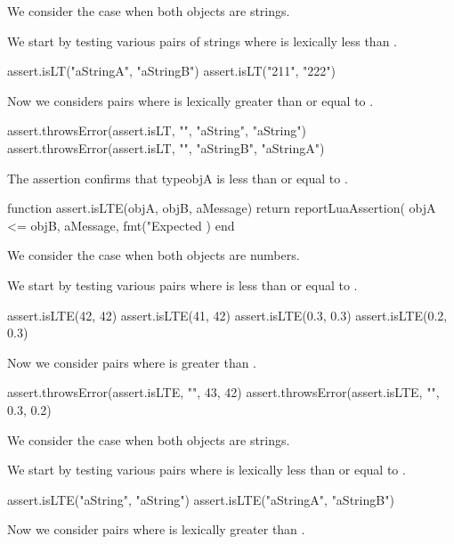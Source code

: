 
We consider the case when both objects are strings. 

We start by testing various pairs of strings where  is 
lexically less than . 

\startLuaTest
  assert.isLT("aStringA", "aStringB")
  assert.isLT("211", "222")
\stopLuaTest

Now we considers pairs where  is lexically greater than or 
equal to . 

\startLuaTest
  assert.throwsError(assert.isLT, "", "aString", "aString")
  assert.throwsError(assert.isLT, "", "aStringB", "aStringA")
\stopLuaTest
\stopTestCase

\stopTestSuite


The  assertion confirms that type{objA} is less than or 
equal to . 

\startLuaCode
function assert.isLTE(objA, objB, aMessage)
  return reportLuaAssertion(
    objA <= objB,
    aMessage,
    fmt("Expected %
  )
end
\stopLuaCode



We consider the case when both objects are numbers. 

We start by testing various pairs where  is less than or equal 
to . 

\startLuaTest
  assert.isLTE(42, 42)
  assert.isLTE(41, 42)
  assert.isLTE(0.3, 0.3)
  assert.isLTE(0.2, 0.3)
\stopLuaTest

Now we consider pairs where  is greater than . 

\startLuaTest
  assert.throwsError(assert.isLTE, "", 43, 42)
  assert.throwsError(assert.isLTE, "", 0.3, 0.2)
\stopLuaTest
\stopTestCase


We consider the case when both objects are strings.

We start by testing various pairs where  is lexically less than 
or equal to . 

\startLuaTest
  assert.isLTE("aString", "aString")
  assert.isLTE("aStringA", "aStringB")
\stopLuaTest

Now we consider pairs where  is lexically greater than 
. 

